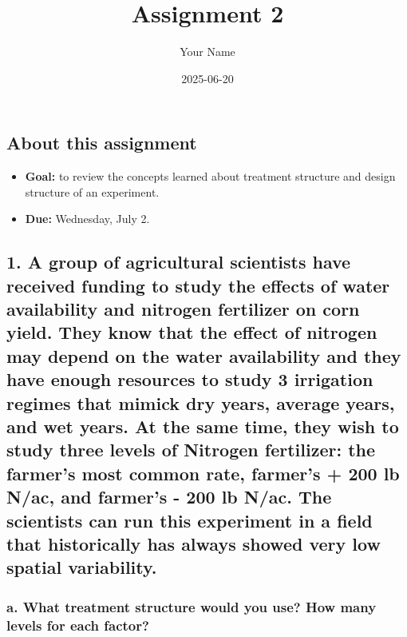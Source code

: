 \documentclass[
]{article}
\title{Assignment 2}
\author{Your Name}
\date{2025-06-20}
\providecommand{\tightlist}{%
  \setlength{\itemsep}{0pt}\setlength{\parskip}{0pt}}
\begin{document}
\maketitle

\subsection{About this assignment}\label{about-this-assignment}

\begin{itemize}
\tightlist
\item
  \textbf{Goal:} to review the concepts learned about treatment
  structure and design structure of an experiment.
\item
  \textbf{Due:} Wednesday, July 2.
\end{itemize}

\subsection{1. A group of agricultural scientists have received funding
to study the effects of water availability and nitrogen fertilizer on
corn yield. They know that the effect of nitrogen may depend on the
water availability and they have enough resources to study 3 irrigation
regimes that mimick dry years, average years, and wet years. At the same
time, they wish to study three levels of Nitrogen fertilizer: the
farmer's most common rate, farmer's + 200 lb N/ac, and farmer's - 200 lb
N/ac. The scientists can run this experiment in a field that
historically has always showed very low spatial
variability.}\label{a-group-of-agricultural-scientists-have-received-funding-to-study-the-effects-of-water-availability-and-nitrogen-fertilizer-on-corn-yield.-they-know-that-the-effect-of-nitrogen-may-depend-on-the-water-availability-and-they-have-enough-resources-to-study-3-irrigation-regimes-that-mimick-dry-years-average-years-and-wet-years.-at-the-same-time-they-wish-to-study-three-levels-of-nitrogen-fertilizer-the-farmers-most-common-rate-farmers-200-lb-nac-and-farmers---200-lb-nac.-the-scientists-can-run-this-experiment-in-a-field-that-historically-has-always-showed-very-low-spatial-variability.}

\subsubsection{a. What treatment structure would you use? How many
levels for each
factor?}\label{a.-what-treatment-structure-would-you-use-how-many-levels-for-each-factor}
\end{document}
